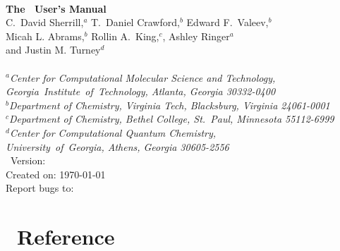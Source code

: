 \documentclass[12pt]{article}
\begin{document}


\begin{center}
\ \\
\vspace{2.0in}
{\bf {\Large The \PSIfour\ User's Manual}} \\
\vspace{0.5in}
C.~David Sherrill,$^a$ T.~Daniel Crawford,$^b$ Edward F.~Valeev,$^b$ \\
Micah L. Abrams,$^b$ Rollin A.~King,$^c$, Ashley Ringer$^a$ \\
and Justin M. Turney$^d$\\
\ \\
{\em $^a$Center for Computational Molecular Science and Technology, 
  \mbox{Georgia Institute of Technology,} Atlanta, Georgia 30332-0400} \\
\vspace{0.1in}
{\em $^b$Department of Chemistry, Virginia Tech, Blacksburg, Virginia 
  24061-0001} \\
\vspace{0.1in}
{\em $^c$Department of Chemistry, Bethel College, St.\ Paul, Minnesota 
  55112-6999} \\
\vspace{0.1in}
{\em $^d$Center for Computational Quantum Chemistry, \\
  \mbox{University of Georgia,} Athens, Georgia 30605-2556}
\ \\
\vspace{0.3in}
\PSIfour\ Version: \PSIversion \\
Created on: \today \\
Report bugs to: \PSIemail \\
\end{center}

\thispagestyle{empty}

\newpage
\tableofcontents
\newpage



%
%
%
%  
%  
%  
%  
%  
%
%
%

\appendix
\section{\PSIfour\ Reference}\label{PSI_Reference}




%



\end{document}
